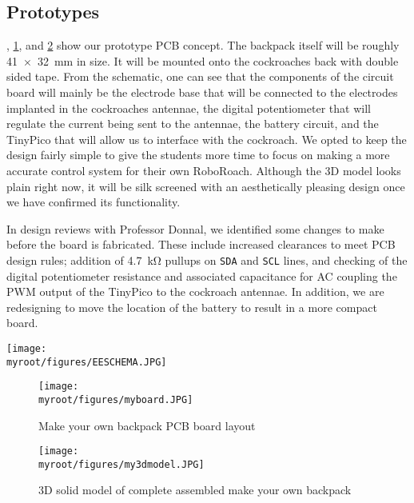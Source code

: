 \documentclass[twocolumn,10pt]{IEEEtran}
\newcommand{\myroot}{.}
\begin{document}
\subsection{Prototypes}
, \ref{fig:board}, and \ref{fig:3d} show our prototype PCB concept. The backpack itself will be roughly \SI{41x32}{\milli\meter} in size. It will be mounted onto the cockroaches back with double sided tape. From the schematic, one can see that the components of the circuit board will mainly be the electrode base that will be connected to the electrodes implanted in the cockroaches antennae, the digital potentiometer that will regulate the current being sent to the antennae, the battery circuit, and the TinyPico that will allow us to interface with the cockroach. We opted to keep the design fairly simple to give the students more time to focus on making a more accurate control system for their own RoboRoach. Although the 3D model looks plain right now, it will be silk screened with an aesthetically pleasing design once we have confirmed its functionality.

In design reviews with Professor Donnal, we identified some changes to make before the board is fabricated. These include increased clearances to meet PCB design rules; addition of \SI{4.7}{\kilo\ohm} pullups on \lstinline{SDA} and \lstinline{SCL} lines, and checking of the digital potentiometer resistance and associated capacitance for AC coupling the PWM output of the TinyPico to the cockroach antennae. In addition, we are redesigning to move the location of the battery to result in a more compact board. 
\begin{figure*}[ht!]
\centering
\texttt{[image: \\myroot/figures/EESCHEMA.JPG]}
\caption{Make your own backpack PCB complete system schematic}
\label{fig:schematic}
\end{figure*}
\begin{figure}[ht!]
\centering
\texttt{[image: \\myroot/figures/myboard.JPG]}
\caption{Make your own backpack PCB board layout}
\label{fig:board}
\end{figure}
\begin{figure}[ht!]
\centering
\texttt{[image: \\myroot/figures/my3dmodel.JPG]}
\caption{3D solid model of complete assembled make your own backpack}
\label{fig:3d}
\end{figure}
\end{document}
